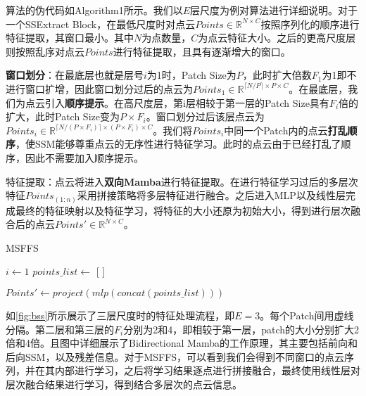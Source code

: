 \documentclass[preprint,12pt]{elsarticle}
\begin{document}
算法的伪代码如Algorithm1所示。我们以$E$层尺度为例对算法进行详细说明。对于一个SSExtract Block，在最低尺度时对点云$Points\in\mathbb{R}^{N\times{C}}$按照序列化的顺序进行特征提取，其窗口最小。其中$N$为点数量，$C$为点云特征大小。之后的更高尺度层则按照乱序对点云$Points$进行特征提取，且具有逐渐增大的窗口。

\textbf{窗口划分}：在最底层也就是层号$i$为1时，Patch Size为$P$，此时扩大倍数$F_1$为1即不进行窗口扩增，因此窗口划分过后的点云为$Points_{1}\in\mathbb{R}^{\lceil N/P \rceil\times P \times C}$。在最底层，我们为点云引入\textbf{顺序提示}。在高尺度层，第i层相较于第一层的Patch Size具有$F_{i}$倍的扩大，此时Patch Size变为$P\times F_{i}$。窗口划分过后该层点云为$Points_{i}\in\mathbb{R}^{\lceil N/(P\times F_{i}) \rceil\times (P\times F_{i}) \times C}$。我们将$Points_{i}$中同一个Patch内的点云\textbf{打乱顺序}，使SSM能够尊重点云的无序性进行特征学习。此时的点云由于已经打乱了顺序，因此不需要加入顺序提示。

特征提取：点云将进入\textbf{双向Mamba}进行特征提取。在进行特征学习过后的多层次特征$Points_{(1:n)}$采用拼接策略将多层特征进行融合。之后进入MLP以及线性层完成最终的特征映射以及特征学习，将特征的大小还原为初始大小，得到进行层次融合后的点云$Points'\in\mathbb{R}^{N\times{C}}$。



	\begin{algorithm}[H]
		\SetAlgoLined %
		\caption{MSFFS} %
		
		$i \leftarrow 1$ \;
		 $points\_list \leftarrow$ [ ]\;
		
		$Points' \leftarrow project(mlp(concat(points\_list)))$\;
		
	\end{algorithm}

	如\cref{fig:bss}所示展示了三层尺度时的特征处理流程，即$E=3$。每个Patch间用虚线分隔。第二层和第三层的$F_{i}$分别为2和4，即相较于第一层，patch的大小分别扩大2倍和4倍。且图中详细展示了Bidirectional Mamba的工作原理，其主要包括前向和后向SSM，以及残差信息。对于MSFFS，可以看到我们会得到不同窗口的点云序列，并在其内部进行学习，之后将学习结果逐点进行拼接融合，最终使用线性层对层次融合结果进行学习，得到结合多层次的点云信息。
\end{document}
